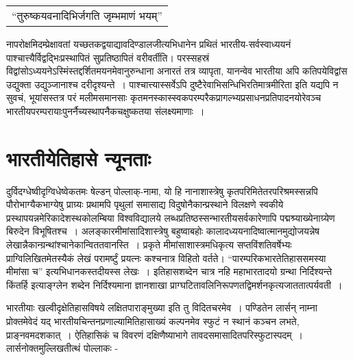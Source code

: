 \vskip -10pt

\hfill {}

\begin{center}
\begin{tabular}{l}
“तुरुष्कयवनादिभिर्जगति जृम्भमाणं भयम्”
\end{tabular}
\end{center}

नापरोक्षमिदम्प्रेक्षावतां यच्छतकद्वयाद्यावदिण्डालजीत्यभिधानेन प्रथितं भारतीय-सर्वस्वाध्ययनं पाश्चात्त्यैर्विद्वद्भिःप्रस्थापितं सुप्रतिष्ठापितं वरीवर्तीति। परस्सहस्रं विद्वांसोऽध्ययनेऽस्मिंस्तद्दर्शितमयनमेवानुरुन्धाना अनारतं तत्र व्यापृता, यानन्वेव भारतीया अपि कतिपये\break विद्वांस उद्युक्ता उद्युञ्जानाश्च दरीदृश्यन्ते~। पाश्चात्त्यास्सर्वेऽपि दुष्टैरेवाभिसन्धिभिरतिमात्रमीरिता इति यद्यपि न सुवचं, भूयांसस्तत्र परं मलीमसमानसाः कृतमनस्कास्स्वकपरम्परैकप्रागल्भ्यप्रसाधनप्रतिपादनयोरेवञ्च भारतीयपरम्परायाःपुनर्नैच्यस्थापनैकचक्षुष्कतया संलक्ष्यमाणाः~।

\vspace{-.3cm}

\section*{भारतीयेतिहासे न्यूनताः}

दुर्विदग्धेष्वीदृग्विधेष्वेकतमः षेल्डन् पोल्लाक्-नामा, यो हि नानाशास्त्रेषु कृतपरिमितेतरपरिश्रमस्सन्नपि पौरोभाग्यैकभाग्येषु प्राग्र्यः प्रथामपि पृथुलां समासाद्य विदुषो\break नैकान्प्रस्थाने विलक्षणे स्वकीये प्रस्थापयन्नमेरिकादेशस्थकोलम्बिया विश्वविद्यालये लब्धप्रतिष्ठस्सन्भारतीयसर्वकारेणापि पद्मश्र्याख्येनाग्र्येण बिरुदेन विभूषितश्च~। अलङ्कारमीमांसादिशास्त्रेषु बहुष्वाबहोः कालादध्ययनादिष्वात्मानमुद्योजयन्नेष लेखान्नैकान्ग्रन्थांश्चानेकान्विततवानस्ति~। प्रकृते मीमांसाशास्त्रमधिकृत्य सप्तविंशतिवर्षेभ्यः प्राग्विलिखितमेतस्यैकं लेखं परामर्ष्टुं प्रयत्नः कश्चनात्र विहितो वर्तते। “पारम्परिकभारतेतिहाससमस्या मीमांसा च”  इत्यभिधानकस्तदीयस्स लेखः~। इतिहासशब्देन चात्र नहि महाभारतादयो ग्रन्था निर्दिश्यन्ते किंतर्हि  इत्याङ्ग्लेन शब्देन निर्दिश्यमाना ज्ञानशाखा प्राग्घटितावलिनिरूपणतद्विमर्शनकृत्यजाततात्पर्यवती~।

भारतीयाः खल्वीदृक्षेतिहासविषये लक्षितपाराङ्मुख्या इति तु विदितचरमेव~। पण्डितेन लार्सन् नाम्ना प्रोक्तमेवेदं यद् भारतीयचिन्तनप्रणाल्यामितिहासाख्यं कल्पनमेव स्फुटं न स्थानं कञ्चन लभते, प्राङ्नवमदशकात्~। ऐतिहासिकं च विवरणं दक्षिणैष्याभागे तावदसमासादितपरिस्फुटास्पदम्~। लार्सनोक्तमुल्लिखतीत्थं पोल्लाकः -

